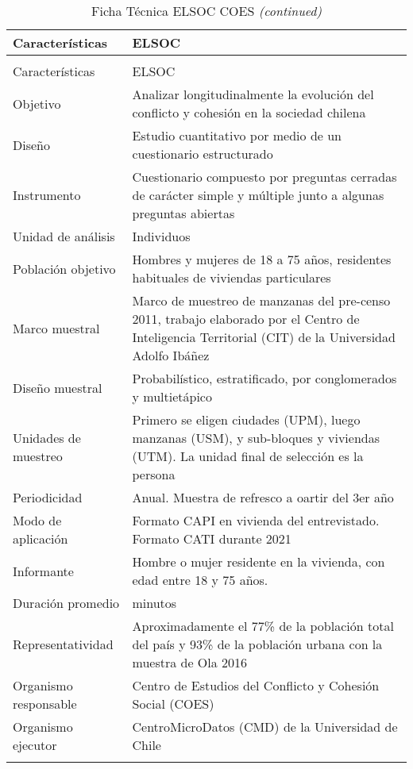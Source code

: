 \documentclass[
  12pt,
]{article}
\begin{document}
\begin{longtable}[t]{>{\raggedright\arraybackslash}p{8em}>{\raggedright\arraybackslash}p{35em}}
\caption{\label{tab:ficha}Ficha Técnica ELSOC COES}\\
\toprule
Características & ELSOC\\
\midrule
\endfirsthead
\caption[]{\label{tab:ficha}Ficha Técnica ELSOC COES \textit{(continued)}}\\
\toprule
Características & ELSOC\\
\midrule
\endhead

\endfoot
\bottomrule
\endlastfoot
Objetivo & Analizar longitudinalmente la evolución del conflicto y cohesión
                              en la sociedad chilena\\
Diseño & Estudio cuantitativo por medio de un cuestionario estructurado\\
Instrumento & Cuestionario compuesto por preguntas cerradas de carácter simple y múltiple junto a algunas preguntas abiertas\\
Unidad de análisis & Individuos\\
Población objetivo & Hombres y mujeres de 18 a 75 años, residentes habituales de viviendas particulares\\
\addlinespace
Marco muestral & Marco de muestreo de manzanas del pre-censo 2011, trabajo elaborado por el Centro de Inteligencia Territorial (CIT) de la Universidad Adolfo Ibáñez\\
Diseño muestral & Probabilístico, estratificado, por conglomerados y multietápico\\
Unidades de muestreo & Primero se eligen ciudades (UPM), luego manzanas (USM), y sub-bloques y viviendas (UTM). La unidad final de selección es la persona\\
Periodicidad & Anual. Muestra de refresco a oartir del 3er año\\
Modo de aplicación & Formato CAPI en vivienda del entrevistado. Formato CATI durante 2021\\
\addlinespace
Informante & Hombre o mujer residente en la vivienda, con edad entre 18 y 75 años.\\
Duración promedio & 51 minutos\\
Representatividad & Aproximadamente el 77\% de la población total del país y 93\% de la
              población urbana con la muestra de Ola 2016\\
Organismo responsable & Centro de Estudios del Conflicto y Cohesión Social (COES)\\
Organismo ejecutor & CentroMicroDatos (CMD) de la Universidad de Chile\\*
\end{longtable}
\end{document}
